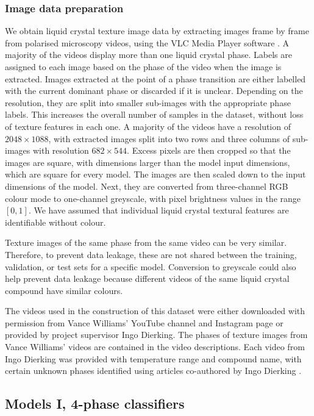 \documentclass[12pt]{article}
\begin{document}
\subsubsection{Image data preparation}
\label{ImgPrep}
We obtain liquid crystal texture image data by extracting images frame by frame from polarised microscopy videos, using the VLC Media Player software \cite{VideoLan06}. A majority of the videos display more than one liquid crystal phase. Labels are assigned to each image based on the phase of the video when the image is extracted. Images extracted at the point of a phase transition are either labelled with the current dominant phase or discarded if it is unclear. Depending on the resolution, they are split into smaller sub-images with the appropriate phase labels. This increases the overall number of samples in the dataset, without loss of texture features in each one. A majority of the videos have a resolution of $2048 \times 1088$, with extracted images split into two rows and three columns of sub-images with resolution $682 \times 544$. Excess pixels are then cropped so that the images are square, with dimensions larger than the model input dimensions, which are square for every model. The images are then scaled down to the input dimensions of the model. Next, they are converted from three-channel RGB colour mode to one-channel greyscale, with pixel brightness values in the range $[0,1]$. We have assumed that individual liquid crystal textural features are identifiable without colour.

Texture images of the same phase from the same video can be very similar. Therefore, to prevent data leakage, these are not shared between the training, validation, or test sets for a specific model. Conversion to greyscale could also help prevent data leakage because different videos of the same liquid crystal compound have similar colours.

The videos used in the construction of this dataset were either downloaded with permission from Vance Williams' YouTube channel and Instagram page \cite{Williams20a, Williams20b} or provided by project supervisor Ingo Dierking. The phases of texture images from Vance Williams' videos are contained in the video descriptions. Each video from Ingo Dierking was provided with temperature range and compound name, with certain unknown phases identified using articles co-authored by Ingo Dierking \cite{Schacht95, Dierking94}.
\subsection{Models I, 4-phase classifiers}
\label{Mods1}
\end{document}
